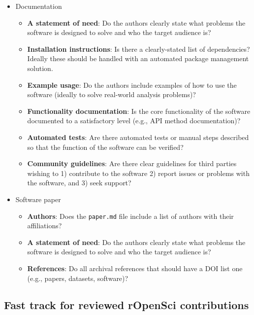 \documentclass{article}
\begin{document}
\begin{itemize}
\item Documentation

\begin{itemize}
    \item \textbf{A statement of need}: Do the authors clearly state what problems the software is designed to solve and who the target audience is?
    \item \textbf{Installation instructions}: Is there a clearly-stated list of dependencies? Ideally these should be handled with an automated package management solution.
    \item \textbf{Example usage}: Do the authors include examples of how to use the software (ideally to solve real-world analysis problems)?
    \item \textbf{Functionality documentation}: Is the core functionality of the software documented to a satisfactory level (e.g., API method documentation)?
    \item \textbf{Automated tests}: Are there automated tests or manual steps described so that the function of the software can be verified?
    \item \textbf{Community guidelines}: Are there clear guidelines for third parties wishing to 1) contribute to the software 2) report issues or problems with the software, and 3) seek support?
\end{itemize}

\item Software paper

\begin{itemize}
    \item \textbf{Authors}: Does the \texttt{paper.md} file include a list of authors with their affiliations?
    \item \textbf{A statement of need}: Do the authors clearly state what problems the software is designed to solve and who the target audience is?
    \item \textbf{References}: Do all archival references that should have a DOI list one (e.g., papers, datasets, software)?
\end{itemize}

\end{itemize}



\subsection{Fast track for reviewed rOpenSci contributions}
\end{document}
